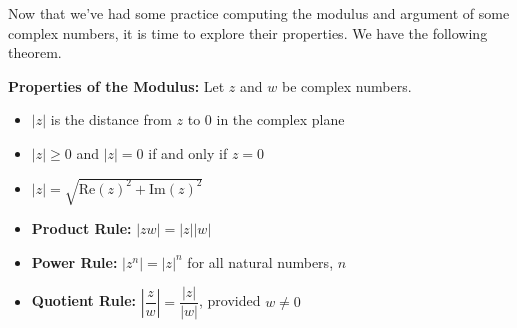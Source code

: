 Now that we've had some practice computing the modulus and argument of some complex numbers, it is time to explore their properties.  We have the following theorem.

\smallskip

\colorbox{ResultColor}{\bbm

\begin{thm} \label{modprops} \textbf{Properties of the Modulus:}  Let $z$ and $w$ be complex numbers.  

\begin{itemize}

\item  $|z|$ is the distance from $z$ to $0$ in the complex plane

\item  $|z| \geq 0$ and $|z| = 0$ if and only if $z=0$

\item  $|z| = \sqrt{\text{Re}(z)^2 + \text{Im}(z)^2}$

\item  \textbf{Product Rule:}  $|zw| = |z||w|$ 

\item  \textbf{Power Rule:}  $\left|z^{n}\right| = |z|^{n}$ for all natural numbers, $n$ 

\item  \textbf{Quotient Rule:}  $\left| \dfrac{z}{w} \right| = \dfrac{|z|}{|w|}$, provided $w \neq 0$ 

\end{itemize}

\end{thm}

\ebm}

\smallskip

